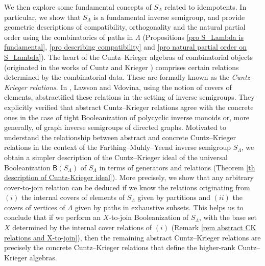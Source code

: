 \documentclass[a4paper,reqno,11pt]{amsart}
\numberwithin{equation}{section}
\theoremstyle{definition}
\theoremstyle{remark}
\begin{document}
We then explore some fundamental concepts of $S_\Lambda$ related to idempotents. In particular, we show that $S_\Lambda$ is a fundamental inverse semigroup, and provide geometric descriptions of compatibility, orthogonality and the natural partial order using the combinatorics of paths in $\Lambda$ (Propositions \ref{pro S_Lambda is fundamental}, \ref{pro describing compatibility} and \ref{pro natural partial order on S_Lambda}). The heart of the Cuntz--Krieger algebras of combinatorial objects (originated in the works of Cuntz and Krieger \cite{CK}) comprises certain relations determined by the combinatorial data. These are formally known as the \emph{Cuntz--Krieger relations}. In \cite{LawsonCK}, Lawson and Vdovina, using the notion of covers of elements, abstractified these relations in the setting of inverse semigroups. They explicitly verified that abstract Cuntz--Krieger relations agree with the concrete ones in the case of tight Booleanization of polycyclic inverse monoids or, more generally, of graph inverse semigroups of directed graphs. Motivated to understand the relationship between abstract and concrete Cuntz--Krieger relations in the context of the Farthing--Muhly--Yeend inverse semigroup $S_\Lambda$, we obtain a simpler description of the Cuntz--Krieger ideal of the universal Booleanization $\mathsf{B}(S_\Lambda)$ of $S_\Lambda$ in terms of generators and relations (Theorem \ref{th description of Cuntz-Krieger ideal}). More precisely, we show that any arbitrary cover-to-join relation can be deduced if we know the relations originating from $(i)$ the internal covers of elements of $S_\Lambda$ given by partitions and $(ii)$ the covers of vertices of $\Lambda$ given by paths in exhaustive subsets. This helps us to conclude that if we perform an $X$-to-join Booleanization \cite{GannaX} of $S_\Lambda$, with the base set $X$ determined by the internal cover relations of $(i)$ (Remark \ref{rem abstract CK relations and X-to-join}), then the remaining abstract Cuntz--Krieger relations are precisely the concrete Cuntz--Krieger relations that define the higher-rank Cuntz--Krieger algebras.
\end{document}
